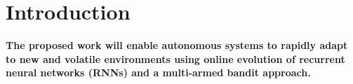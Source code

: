 \section{Introduction}















\textbf{The proposed work will enable autonomous systems to rapidly adapt to new and volatile environments using online evolution of recurrent neural networks (RNNs) and a multi-armed bandit approach.}









